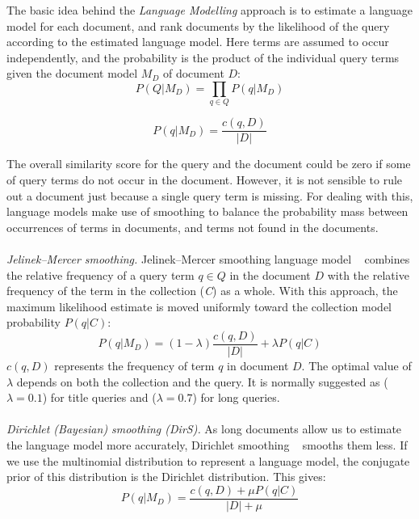 The basic idea behind the \textit{Language Modelling} approach is to estimate a language model for each document, and rank documents by the likelihood of the query according to the estimated language model. Here terms are assumed to occur independently, and the probability is the product of the individual query terms given the document model $ M_{D} $ of document $ D $:
\begin{equation}
\label{eq:multinomial}
 P(Q|M_{D}) = \prod\limits_{q\in Q} P(q|M_{D}) 
\end{equation}

\begin{equation}
\label{eq:multinomial}
 P(q|M_{D}) = \frac{c(q,D)}{|D|}
\end{equation}

The overall similarity score for the query and the document could be zero if some of query terms do not occur in the document. However, it is not sensible to rule out a document just because a single query term is missing. For dealing with this, language models make use of smoothing to balance the probability mass between occurrences of terms in documents, and terms not found in the documents.
\\\\
\textit{Jelinek–Mercer smoothing.} Jelinek–Mercer smoothing language model ~\citep{zhai2004study} combines the relative frequency of a query term $ q\in Q $ in the document $ D $ with the relative frequency of the term in the collection (\textit{C}) as a whole. With this approach, the maximum likelihood estimate is moved uniformly toward the collection model probability $ P(q|C) $:
\begin{equation}
P(q|M_{D}) = (1-\lambda)\frac{c(q,D)}{|D|}+\lambda P(q|C) 
\label{eq:jmsmoothing}
\end{equation} 
$ c(q,D) $ represents the frequency of term $ q $ in document $ D $. The optimal value of $ \lambda $ depends on both the collection and the query. It is normally suggested as ($ \lambda = 0.1$) for title queries and ($ \lambda = 0.7$) for long queries.
\\\\
\textit{Dirichlet (Bayesian) smoothing (DirS).} As long documents allow us to estimate the language model more accurately, Dirichlet smoothing ~\citep{zhai2004study} smooths them less. If we use the multinomial distribution to represent a language model, the conjugate prior of this distribution is the Dirichlet distribution. This gives:
\begin{equation}
\label{eq:bayessmoothing}
 P(q|M_{D}) = \frac{c(q,D) + \mu P(q|C)}{|D| + \mu}
\end{equation} 

